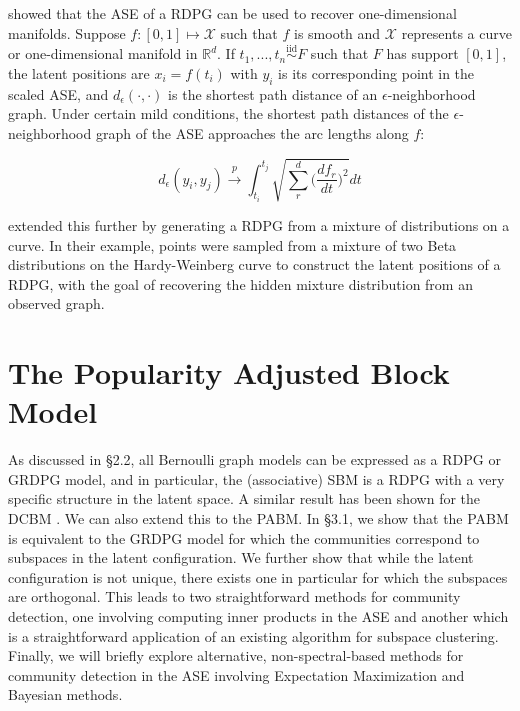 \documentclass[
  11pt,
]{article}
\begin{document}
\citet{trosset2020learning} showed that the ASE of a RDPG can be used to
recover one-dimensional manifolds. Suppose
\(f : [0, 1] \mapsto \mathcal{X}\) such that \(f\) is smooth and
\(\mathcal{X}\) represents a curve or one-dimensional manifold in
\(\mathbb{R}^d\). If \(t_1, ..., t_n \stackrel{\text{iid}}{\sim}F\) such
that \(F\) has support \([0, 1]\), the latent positions are
\(x_i = f(t_i)\) with \(y_i\) is its corresponding point in the scaled
ASE, and \(d_{\epsilon}(\cdot, \cdot)\) is the shortest path distance of
an \(\epsilon\)-neighborhood graph. Under certain mild conditions, the
shortest path distances of the \(\epsilon\)-neighborhood graph of the
ASE approaches the arc lengths along \(f\):

\begin{equation}
d_{\epsilon}(y_i, y_j) \stackrel{p}{\to} \int_{t_i}^{t_j} \sqrt{\sum_r^d \Big( \frac{d f_r}{d t} \Big)^2} dt
\end{equation}

\citet{athreya2020estimation} extended this further by generating a RDPG
from a mixture of distributions on a curve. In their example, points
were sampled from a mixture of two Beta distributions on the
Hardy-Weinberg curve to construct the latent positions of a RDPG, with
the goal of recovering the hidden mixture distribution from an observed
graph.

\hypertarget{the-popularity-adjusted-block-model}{%
\section{The Popularity Adjusted Block
Model}\label{the-popularity-adjusted-block-model}}

As discussed in \S 2.2, all Bernoulli graph models can be expressed as a
RDPG or GRDPG model, and in particular, the (associative) SBM is a RDPG
with a very specific structure in the latent space. A similar result has
been shown for the DCBM \cite{lyzinski2014}. We can also extend this to
the PABM. In \S 3.1, we show that the PABM is equivalent to the GRDPG
model for which the communities correspond to subspaces in the latent
configuration. We further show that while the latent configuration is
not unique, there exists one in particular for which the subspaces are
orthogonal. This leads to two straightforward methods for community
detection, one involving computing inner products in the ASE and another
which is a straightforward application of an existing algorithm for
subspace clustering. Finally, we will briefly explore alternative,
non-spectral-based methods for community detection in the ASE involving
Expectation Maximization and Bayesian methods.
\end{document}
